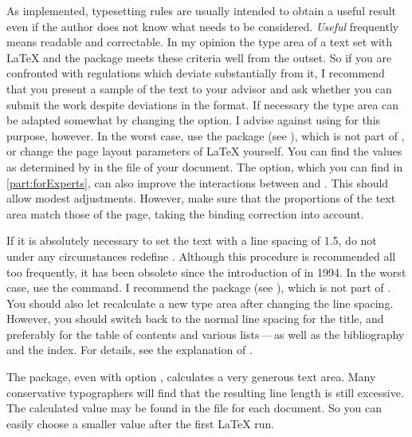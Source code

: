 As implemented, typesetting rules are usually intended to obtain a useful
result even if the author does not know what needs to be considered.
\emph{Useful} frequently means readable and correctable. In my opinion the
type area of a text set with {\LaTeX} and the  package meets
these criteria well from the outset. So if you are confronted with regulations
which deviate substantially from it, I recommend that you present a sample of
the text to your advisor and ask whether you can submit the work despite
deviations in the format.  If necessary the type area can be adapted somewhat
by changing the %
 option. I advise against
using  for this purpose, however. In the
worst case, use the  package%
 (see
\cite{package:geometry}), which is not part of \KOMAScript, or change the page
layout parameters of \LaTeX{} yourself. You can find the values as determined
by  in the  file of your document. The
%
 option, which you
can find in \autoref{part:forExperts}, can also improve the interactions
between  and . This should allow modest
adjustments. However, make sure that the proportions of the text area match
those of the page, taking the binding correction into account.

If it is absolutely necessary to set the text with a line spacing of 1.5, do
not under any circumstances redefine .  Although this
procedure is recommended all too frequently, it has been obsolete since the
introduction of {\LaTeXe} in 1994. In the worst case, use the
 command. I recommend the package
 (see
\cite{package:setspace}), which is not part of \KOMAScript. You should also
let  recalculate a new type area after changing the line
spacing. However, you should switch back to the normal line spacing for the
title, and preferably for the table of contents and various lists\,---\,as
well as the bibliography and the index. For details, see the explanation of
%
.

The  package, even with option
%
, calculates a very generous
text area. Many conservative typographers will find that the resulting line
length is still excessive. The calculated  value may be found in the
 file for each document. So you can easily choose a smaller value
after the first {\LaTeX} run.

